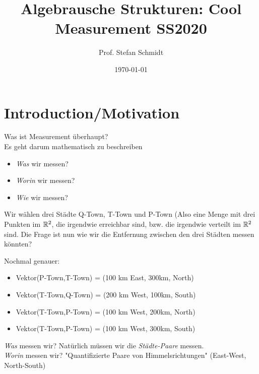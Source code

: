 \documentclass{article}
\title{Algebrausche Strukturen: Cool Measurement SS2020}
\author{Prof. Stefan Schmidt}
\date{\today}
\begin{document}
	
	\maketitle
	
	\section{Introduction/Motivation}
	Was ist Measurement überhaupt?\\
	Es geht darum mathematisch zu beschreiben
	\begin{itemize}
		\item \emph{Was} wir messen?
		\item \emph{Worin} wir messen?
		\item \emph{Wie} wir messen?
	\end{itemize}
	
	\begin{example}
		Wir wählen drei Städte Q-Town, T-Town und P-Town (Also eine Menge mit drei Punkten im $\mathbb{R}^2$, die irgendwie erreichbar sind, bzw. die irgendwie verteilt im $\mathbb{R}^2$ sind. Die Frage ist nun wie wir die Entfernung zwischen den drei Städten messen könnten?
	\end{example}
	\begin{example}
		Nochmal genauer:
		\begin{itemize}
			\item Vektor(P-Town,T-Town) = (100 km East, 300km, North)
			\item Vektor(T-Town,Q-Town) = (200 km West, 100km, South)
			\item Vektor(T-Town,P-Town) = (100 km West, 200km, North)
			\item Vektor(T-Town,P-Town) = (100 km West, 300km, South)
		\end{itemize}
		\emph{Was} messen wir? Natürlich müssen wir die \emph{Städte-Paare} messen.\\
		\emph{Worin} messen wir? "Quantifizierte Paare von Himmelsrichtungen" (East-West, North-South)
	\end{example}
	
\end{document}
